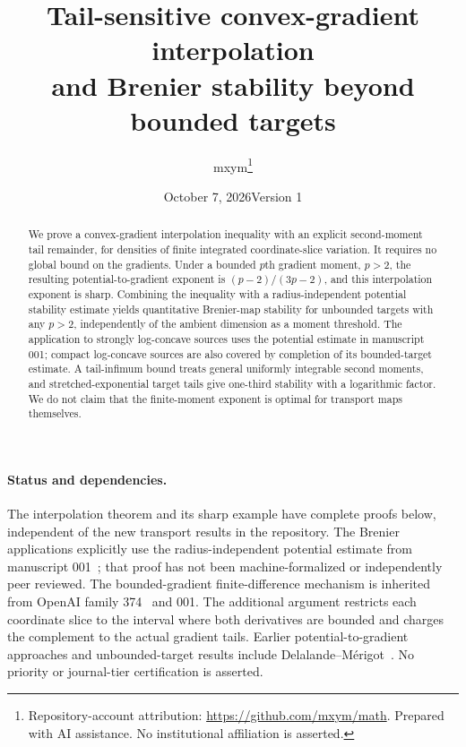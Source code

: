 \documentclass[11pt]{article}
\title{Tail-sensitive convex-gradient interpolation\\and Brenier stability beyond bounded targets}
\author{mxym\thanks{Repository-account attribution: \url{https://github.com/mxym/math}. Prepared with AI assistance. No institutional affiliation is asserted.}}
\date{October 7, 2026\quad Version 1}
\theoremstyle{remark}\newtheorem{remark}[theorem]{Remark}
\begin{document}
\maketitle
\begin{abstract}
We prove a convex-gradient interpolation inequality with an explicit second-moment tail remainder, for densities of finite integrated coordinate-slice variation. It requires no global bound on the gradients. Under a bounded $p$th gradient moment, $p>2$, the resulting potential-to-gradient exponent is $(p-2)/(3p-2)$, and this interpolation exponent is sharp. Combining the inequality with a radius-independent potential stability estimate yields quantitative Brenier-map stability for unbounded targets with any $p>2$, independently of the ambient dimension as a moment threshold. The application to strongly log-concave sources uses the potential estimate in manuscript 001; compact log-concave sources are also covered by completion of its bounded-target estimate. A tail-infimum bound treats general uniformly integrable second moments, and stretched-exponential target tails give one-third stability with a logarithmic factor. We do not claim that the finite-moment exponent is optimal for transport maps themselves.
\end{abstract}
\paragraph{Status and dependencies.}
The interpolation theorem and its sharp example have complete proofs below, independent of the new transport results in the repository. The Brenier applications explicitly use the radius-independent potential estimate from manuscript 001~\cite{M001}; that proof has not been machine-formalized or independently peer reviewed. The bounded-gradient finite-difference mechanism is inherited from OpenAI family 374~\cite{O374} and 001. The additional argument restricts each coordinate slice to the interval where both derivatives are bounded and charges the complement to the actual gradient tails. Earlier potential-to-gradient approaches and unbounded-target results include Delalande--M\'erigot~\cite{DM}. No priority or journal-tier certification is asserted.
\end{document}

